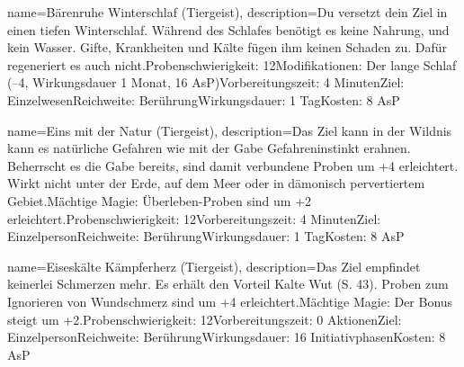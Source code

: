 {
    name={Bärenruhe Winterschlaf (Tiergeist)},
    description={Du versetzt dein Ziel in einen tiefen Winterschlaf. Während des Schlafes benötigt es keine Nahrung, und kein Wasser. Gifte, Krankheiten und Kälte fügen ihm keinen Schaden zu. Dafür regeneriert es auch nicht.\newline Probenschwierigkeit: 12\newline Modifikationen: Der lange Schlaf (–4, Wirkungsdauer 1 Monat, 16 AsP)\newline Vorbereitungszeit: 4 Minuten\newline Ziel: Einzelwesen\newline Reichweite: Berührung\newline Wirkungsdauer: 1 Tag\newline Kosten: 8 AsP}
}


{
    name={Eins mit der Natur (Tiergeist)},
    description={Das Ziel kann in der Wildnis kann es natürliche Gefahren wie mit der Gabe Gefahreninstinkt erahnen. Beherrscht es die Gabe bereits, sind damit verbundene Proben um +4 erleichtert. Wirkt nicht unter der Erde, auf dem Meer oder in dämonisch pervertiertem Gebiet.\newline Mächtige Magie: Überleben-Proben sind um +2 erleichtert.\newline Probenschwierigkeit: 12\newline Vorbereitungszeit: 4 Minuten\newline Ziel: Einzelperson\newline Reichweite: Berührung\newline Wirkungsdauer: 1 Tag\newline Kosten: 8 AsP}
}


{
    name={Eiseskälte Kämpferherz (Tiergeist)},
    description={Das Ziel empfindet keinerlei Schmerzen mehr. Es erhält den Vorteil Kalte Wut (S. 43). Proben zum Ignorieren von Wundschmerz sind um +4 erleichtert.\newline Mächtige Magie: Der Bonus steigt um +2.\newline Probenschwierigkeit: 12\newline Vorbereitungszeit: 0 Aktionen\newline Ziel: Einzelperson\newline Reichweite: Berührung\newline Wirkungsdauer: 16 Initiativphasen\newline Kosten: 8 AsP}
}


